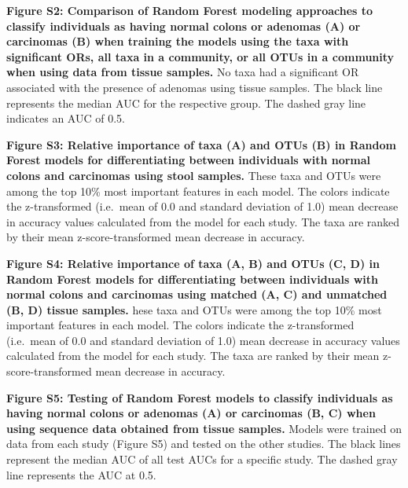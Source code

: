 \documentclass[12pt,]{article}
\begin{document}
\textbf{Figure S2: Comparison of Random Forest modeling approaches to
classify individuals as having normal colons or adenomas (A) or
carcinomas (B) when training the models using the taxa with significant
ORs, all taxa in a community, or all OTUs in a community when using data
from tissue samples.} No taxa had a significant OR associated with the
presence of adenomas using tissue samples. The black line represents the
median AUC for the respective group. The dashed gray line indicates an
AUC of 0.5.

\textbf{Figure S3: Relative importance of taxa (A) and OTUs (B) in
Random Forest models for differentiating between individuals with normal
colons and carcinomas using stool samples.} These taxa and OTUs were
among the top 10\% most important features in each model. The colors
indicate the z-transformed (i.e.~mean of 0.0 and standard deviation of
1.0) mean decrease in accuracy values calculated from the model for each
study. The taxa are ranked by their mean z-score-transformed mean
decrease in accuracy.

\textbf{Figure S4: Relative importance of taxa (A, B) and OTUs (C, D) in
Random Forest models for differentiating between individuals with normal
colons and carcinomas using matched (A, C) and unmatched (B, D) tissue
samples.} hese taxa and OTUs were among the top 10\% most important
features in each model. The colors indicate the z-transformed (i.e.~mean
of 0.0 and standard deviation of 1.0) mean decrease in accuracy values
calculated from the model for each study. The taxa are ranked by their
mean z-score-transformed mean decrease in accuracy.

\textbf{Figure S5: Testing of Random Forest models to classify
individuals as having normal colons or adenomas (A) or carcinomas (B, C)
when using sequence data obtained from tissue samples.} Models were
trained on data from each study (Figure S5) and tested on the other
studies. The black lines represent the median AUC of all test AUCs for a
specific study. The dashed gray line represents the AUC at 0.5.

\newpage
\end{document}
